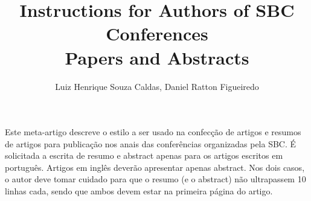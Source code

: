 \documentclass[12pt]{article}
\title{Instructions for Authors of SBC Conferences\\ Papers and Abstracts}
\author{Luiz Henrique Souza Caldas, Daniel Ratton Figueiredo}
\begin{document}
 

\maketitle
     
\begin{resumo} 
  Este meta-artigo descreve o estilo a ser usado na confecção de artigos e
  resumos de artigos para publicação nos anais das conferências organizadas
  pela SBC. É solicitada a escrita de resumo e abstract apenas para os artigos
  escritos em português. Artigos em inglês deverão apresentar apenas abstract.
  Nos dois casos, o autor deve tomar cuidado para que o resumo (e o abstract)
  não ultrapassem 10 linhas cada, sendo que ambos devem estar na primeira
  página do artigo.
\end{resumo}








\end{document}

